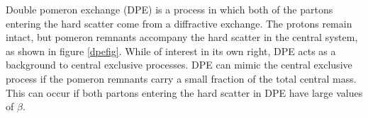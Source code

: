 Double pomeron exchange (DPE) is a process in which both of the partons entering the hard scatter come from a diffractive exchange. The protons remain intact, but pomeron remnants accompany the hard scatter in the central system, as shown in figure \ref{dpefig}. While of interest in its own right, DPE acts as a background to central exclusive processes. DPE can mimic the central exclusive process if the pomeron remnants carry a small fraction of the total central mass. This can occur if both partons entering the hard scatter in DPE have large values of $\beta$. 




